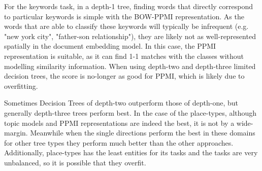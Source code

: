 For the keywords task,  in a depth-1 tree, finding words that  directly correspond to particular keywords is simple with the BOW-PPMI representation. As the words that are able to classify these keywords will typically be infrequent (e.g. "new york city", "father-son relationship"), they are likely not as well-represented spatially in the  document embedding model. In this case, the PPMI representation is suitable, as it can find 1-1 matches with the classes without modelling similarity information. When using depth-two and depth-three limited decision trees, the score is no-longer as good for PPMI, which is likely  due to overfitting. 

Sometimes Decision Trees of depth-two outperform those of depth-one, but generally depth-three trees perform best.  In the case of the place-types, although topic models and PPMI representations are indeed the best, it is not by a wide-margin. Meanwhile when the single directions perform the best in these domains for other tree types they perform much better than the other approaches. Additionally, place-types has the least entities for its tasks and the tasks are very unbalanced, so it is possible that they overfit. 



